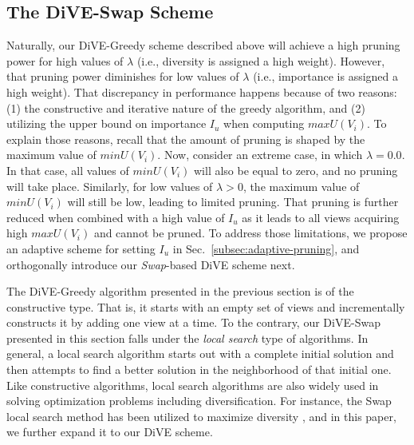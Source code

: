 

\subsection{The DiVE-Swap Scheme}
\label{subsec:dive-swap}

Naturally, our DiVE-Greedy scheme described above will achieve a high pruning power for high values of $\lambda$ (i.e., diversity is assigned a high weight).
%
However, that pruning power diminishes for low values of $\lambda$ (i.e., importance is assigned a high weight).
%
That discrepancy in performance happens because of two reasons: 
%
(1) the constructive and iterative nature of the greedy algorithm, and (2) utilizing the upper bound on importance $I_u$ when computing $maxU(V_i)$. 
%
To explain those reasons, recall that the amount of pruning is shaped by the maximum value of $minU(V_i)$.
%
Now, consider an extreme case, in which $\lambda = 0.0$. 
%
In that case, all values of $minU(V_i)$ will also be equal to zero, and no pruning will take place. 
%
Similarly, for low values of $\lambda > 0$, the maximum value of $minU(V_i)$ will still be low, leading to limited pruning. 
%
That pruning is further reduced when combined with a high value of $I_u$ as it leads to all views acquiring high $maxU(V_i)$ and cannot be pruned.  
%
To address those limitations, we propose an adaptive scheme for setting $I_u$ in Sec.~\ref{subsec:adaptive-pruning}, and  orthogonally introduce our {\em Swap}-based DiVE scheme next.


The DiVE-Greedy algorithm presented in the previous section is of the constructive type. 
%
That is, it starts with an empty set of views and incrementally constructs it by adding one view at a time. 
%
To the contrary, our DiVE-Swap presented in this section falls under the {\em local search} type of algorithms. 
%
In general, a local search algorithm starts out with a complete initial solution and then attempts to find a better solution in the neighborhood of that initial one. 
%
Like constructive algorithms, local search algorithms are also widely used in solving optimization problems including diversification. 
%
For instance, the Swap local search method has been utilized to maximize diversity \cite{Drosou, Vieira2011}, and in this paper, we further expand it to our DiVE scheme. 

